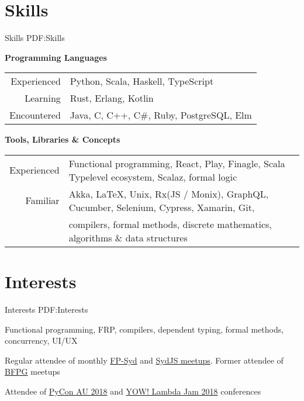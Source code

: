 \documentclass[a4paper,10pt,oneside]{article}
\begin{document}
\begin{minipage}[t][0pt]{\linewidth}
\begin{body}

\section
{Skills}
{Skills}
{PDF:Skills}

\textbf{Programming Languages}
\par
\begin{tabular}{rl}
\par Experienced & Python, Scala, Haskell, TypeScript\\
\par Learning & Rust, Erlang, Kotlin\\
\par Encountered & Java, C, C++, C\#, Ruby, PostgreSQL, Elm
\end{tabular}

\EntryGap
\EntryGap
\EntryGap

\textbf{Tools, Libraries \& Concepts}

\par
\begin{tabular}{rl}
\par Experienced & Functional programming, React, Play, Finagle, Scala Typelevel ecosystem, Scalaz, formal logic\\
\par Familiar & Akka, \LaTeX, Unix, Rx(JS / Monix), GraphQL, Cucumber, Selenium, Cypress, Xamarin, Git,\\
& compilers, formal methods, discrete mathematics, algorithms \& data structures\\
\end{tabular}

\EntryGap

\section
{Interests}
{Interests}
{PDF:Interests}

\par Functional programming, FRP, compilers, dependent typing, formal methods, concurrency, UI/UX
\par Regular attendee of monthly \href{https://www.meetup.com/en-AU/FP-Syd/}{FP-Syd} and \href{https://www.sydjs.com/}{SydJS meetups}. Former attendee of \href{https://www.meetup.com/en-AU/Brisbane-Functional-Programming-Group/}{BFPG} meetups
\par Attendee of \href{https://2018.pycon-au.org/}{PyCon AU 2018} and \href{http://lambdajam.yowconference.com.au/}
{YOW! Lambda Jam 2018} conferences



\end{body}
\end{minipage}
\end{document}

